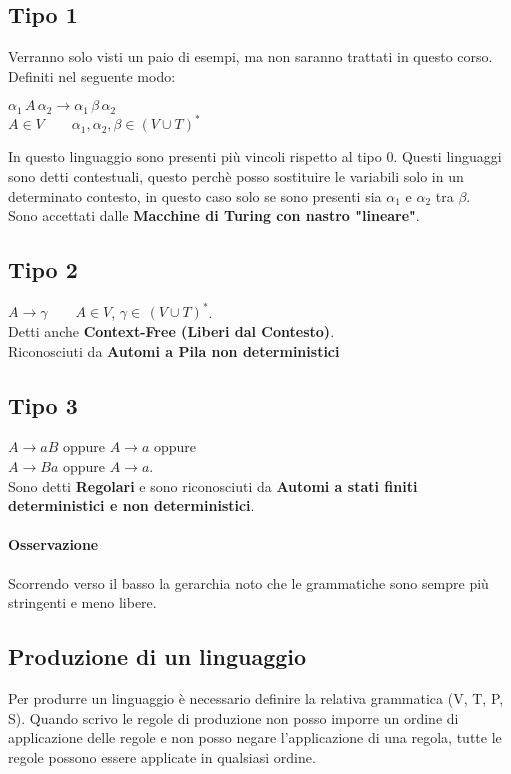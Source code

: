 \documentclass[12pt, a4paper, openany]{book}
\begin{document}
\subsection{Tipo 1}
Verranno solo visti un paio di esempi, ma non saranno trattati in questo corso.
\\ Definiti nel seguente modo:
\begin{center}
    $\alpha_1 \, A \, \alpha_2 \rightarrow \alpha_1 \, \beta \, \alpha_2$
    \\ $A\in V \qquad \alpha_1, \alpha_2, \beta \in (V \cup T)^*$
\end{center}
In questo linguaggio sono presenti più vincoli rispetto al tipo 0.
Questi linguaggi sono detti contestuali, questo perchè posso sostituire le variabili solo in un determinato contesto, in questo caso
solo se sono presenti sia $\alpha_1$ e $\alpha_2$ tra $\beta$.
\\ Sono accettati dalle \textbf{Macchine di Turing con nastro "lineare"}.
\subsection{Tipo 2}
$A\rightarrow \gamma \qquad A \in V$, $\gamma \in \, (V \cup T)^*$.
\\ Detti anche \textbf{Context-Free (Liberi dal Contesto)}.
\\ Riconosciuti da \textbf{Automi a Pila non deterministici}
\subsection{Tipo 3}
$A \rightarrow aB$ oppure $A \rightarrow a$ oppure
\\ $A \rightarrow Ba$ oppure $A \rightarrow a$.
\\Sono detti \textbf{Regolari} e sono riconosciuti da \textbf{Automi
a stati finiti deterministici e non deterministici}.

\paragraph*{Osservazione}Scorrendo verso il basso la gerarchia noto che le grammatiche sono sempre più
stringenti e meno libere.

\subsection*{Produzione di un linguaggio}
Per produrre un linguaggio è necessario definire la relativa grammatica (V, T, P, S).
Quando scrivo le regole di produzione non posso imporre un ordine di applicazione delle regole e non posso
negare l'applicazione di una regola, tutte le regole possono essere applicate in qualsiasi ordine.
\end{document}
